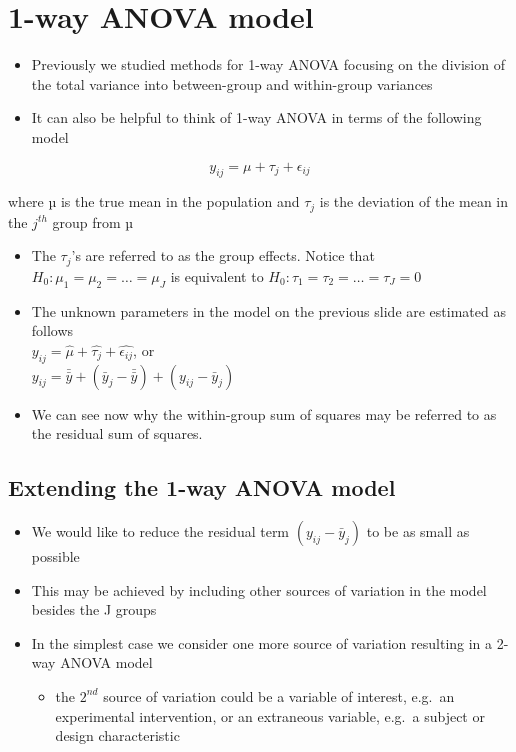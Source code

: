\documentclass[
]{book}
\providecommand{\tightlist}{%
  \setlength{\itemsep}{0pt}\setlength{\parskip}{0pt}}
\begin{document}
\hypertarget{way-anova-model}{%
\section{1-way ANOVA model}\label{way-anova-model}}

\begin{itemize}
\tightlist
\item
  Previously we studied methods for 1-way ANOVA focusing on the division of the total variance into between-group and within-group variances
\item
  It can also be helpful to think of 1-way ANOVA in terms of the following model
\end{itemize}

\[y_{ij}=\mu+\tau_j+\epsilon_{ij}\]

where µ is the true mean in the population and \(\tau_j\) is the deviation of the mean in the \(j^{th}\) group from µ

\begin{itemize}
\tightlist
\item
  The \(\tau_j\)'s are referred to as the group effects. Notice that \(H_0: μ_1 = μ_2 = … = μ_J\) is equivalent to \(H_0: τ_1 = \tau_2 = … = τ_J = 0\)
\item
  The unknown parameters in the model on the previous slide are estimated as follows\\
  \(y_{ij}=\hat{\mu}+\hat{\tau_j}+\hat{\epsilon_{ij}}\), or\\
  \(y_{ij}=\bar{\bar y}+(\bar y_j-\bar{\bar y})+(y_{ij}-\bar y_j)\)
\item
  We can see now why the within-group sum of squares may be referred to as the residual sum of squares.
\end{itemize}

\hypertarget{extending-the-1-way-anova-model}{%
\subsection{Extending the 1-way ANOVA model}\label{extending-the-1-way-anova-model}}

\begin{itemize}
\tightlist
\item
  We would like to reduce the residual term \((y_{ij}-\bar y_j)\) to be as small as possible
\item
  This may be achieved by including other sources of variation in the model besides the J groups
\item
  In the simplest case we consider one more source of variation resulting in a 2-way ANOVA model

  \begin{itemize}
  \tightlist
  \item
    the \(2^{nd}\) source of variation could be a variable of interest, e.g.~an experimental intervention, or an extraneous variable, e.g.~a subject or design characteristic
  \end{itemize}
\end{itemize}
\end{document}
